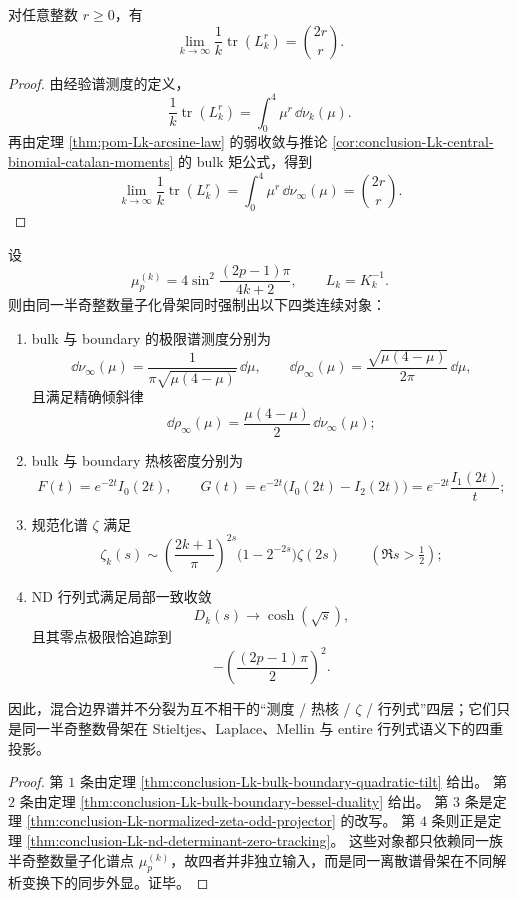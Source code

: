 \begin{corollary}[归一化迹矩的中心二项式极限]\label{cor:conclusion-Lk-normalized-trace-moments-central-binomial}
对任意整数 \(r\ge 0\)，有
\[
\lim_{k\to\infty}\frac{1}{k}\operatorname{tr}(L_k^r)
=
\binom{2r}{r}.
\]
\end{corollary}

\begin{proof}
由经验谱测度的定义，
\[
\frac{1}{k}\operatorname{tr}(L_k^r)=\int_0^4 \mu^r\,\dd\nu_k(\mu).
\]
再由定理 \ref{thm:pom-Lk-arcsine-law} 的弱收敛与推论 \ref{cor:conclusion-Lk-central-binomial-catalan-moments} 的 bulk 矩公式，得到
\[
\lim_{k\to\infty}\frac{1}{k}\operatorname{tr}(L_k^r)
=
\int_0^4 \mu^r\,\dd\nu_\infty(\mu)
=
\binom{2r}{r}.
\]
\end{proof}

\begin{theorem}[半奇整数混合边界谱的四联刚性]\label{thm:conclusion-halfodd-mixed-boundary-spectrum-fourfold-rigidity}
设
\[
\mu_p^{(k)}=4\sin^2\!\frac{(2p-1)\pi}{4k+2},
\qquad
L_k=K_k^{-1}.
\]
则由同一半奇整数量子化骨架同时强制出以下四类连续对象：
\begin{enumerate}
  \item bulk 与 boundary 的极限谱测度分别为
  \[
  \dd\nu_\infty(\mu)=\frac{1}{\pi\sqrt{\mu(4-\mu)}}\,\dd\mu,
  \qquad
  \dd\rho_\infty(\mu)=\frac{\sqrt{\mu(4-\mu)}}{2\pi}\,\dd\mu,
  \]
  且满足精确倾斜律
  \[
  \dd\rho_\infty(\mu)=\frac{\mu(4-\mu)}{2}\,\dd\nu_\infty(\mu);
  \]
  \item bulk 与 boundary 热核密度分别为
  \[
  F(t)=e^{-2t}I_0(2t),
  \qquad
  G(t)=e^{-2t}\bigl(I_0(2t)-I_2(2t)\bigr)=e^{-2t}\frac{I_1(2t)}{t};
  \]
  \item 规范化谱 \(\zeta\) 满足
  \[
  \zeta_k(s)\sim \left(\frac{2k+1}{\pi}\right)^{2s}\!\bigl(1-2^{-2s}\bigr)\zeta(2s)
  \qquad
  (\Re s>\tfrac12);
  \]
  \item ND 行列式满足局部一致收敛
  \[
  D_k(s)\longrightarrow \cosh(\sqrt{s}),
  \]
  且其零点极限恰追踪到
  \[
  -\left(\frac{(2p-1)\pi}{2}\right)^2.
  \]
\end{enumerate}
因此，混合边界谱并不分裂为互不相干的“测度 / 热核 / \(\zeta\) / 行列式”四层；它们只是同一半奇整数骨架在 Stieltjes、Laplace、Mellin 与 entire 行列式语义下的四重投影。
\end{theorem}

\begin{proof}
第 \(1\) 条由定理 \ref{thm:conclusion-Lk-bulk-boundary-quadratic-tilt} 给出。
第 \(2\) 条由定理 \ref{thm:conclusion-Lk-bulk-boundary-bessel-duality} 给出。
第 \(3\) 条是定理 \ref{thm:conclusion-Lk-normalized-zeta-odd-projector} 的改写。
第 \(4\) 条则正是定理 \ref{thm:conclusion-Lk-nd-determinant-zero-tracking}。
这些对象都只依赖同一族半奇整数量子化谱点 \(\mu_p^{(k)}\)，故四者并非独立输入，而是同一离散谱骨架在不同解析变换下的同步外显。证毕。
\end{proof}

